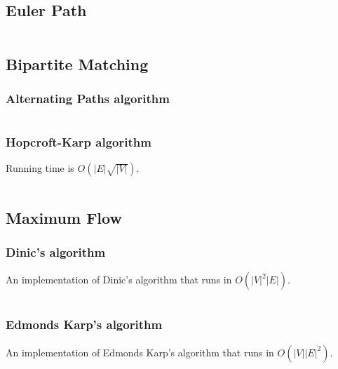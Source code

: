 \documentclass[9pt,a4paper,twocolumn,landscape,oneside]{amsart}
\newcommand{\code}[1]{\inputminted{cpp}{_code/#1}}
\newif\ifverbose
\begin{document}
    \subsection{Euler Path}
        \ifverbose
        Finds an euler path (or circuit) in a directed graph, or reports that
        none exist.
        \fi
        \code{graph/euler_path.cpp}

    \subsection{Bipartite Matching}

        \subsubsection{Alternating Paths algorithm}
            \ifverbose
            The alternating paths algorithm solves bipartite matching in $O(mn^2)$
            time, where $m$, $n$ are the number of vertices on the left and right
            side of the bipartite graph, respectively.
            \fi
            \code{graph/bipartite_matching.cpp}

        \subsubsection{Hopcroft-Karp algorithm}
            \ifverbose
            An implementation of Hopcroft-Karp algorithm for bipartite
            matching.
            \fi
            Running time is $O(|E|\sqrt{|V|})$.
            \code{graph/hopcroft_karp.cpp}

    \subsection{Maximum Flow}
        \subsubsection{Dinic's algorithm}
            An implementation of Dinic's algorithm that runs in
            $O(|V|^2|E|)$.
            \ifverbose
            It computes the maximum flow of a flow network.
            \fi
            \code{graph/dinic.cpp}

        \subsubsection{Edmonds Karp's algorithm}
            An implementation of Edmonds Karp's algorithm that runs in
            $O(|V||E|^2)$.
            \ifverbose
            It computes the maximum flow of a flow network.
            \fi
            \code{graph/edmonds_karps.cpp}
\end{document}
